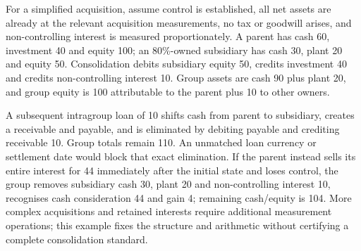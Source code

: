 For a simplified acquisition, assume control is established, all net assets
are already at the relevant acquisition measurements, no tax or goodwill
arises, and non-controlling interest is measured proportionately. A parent
has cash 60, investment 40 and equity 100; an 80\%-owned subsidiary has cash
30, plant 20 and equity 50. Consolidation debits subsidiary equity 50,
credits investment 40 and credits non-controlling interest 10. Group assets
are cash 90 plus plant 20, and group equity is 100 attributable to the parent
plus 10 to other owners.

A subsequent intragroup loan of 10 shifts cash from parent to subsidiary,
creates a receivable and payable, and is eliminated by debiting payable and
crediting receivable 10. Group totals remain 110. An unmatched loan currency
or settlement date would block that exact elimination. If the parent instead
sells its entire interest for 44 immediately after the initial state and
loses control, the group removes subsidiary cash 30, plant 20 and
non-controlling interest 10, recognises cash consideration 44 and gain 4;
remaining cash/equity is 104. More complex acquisitions and retained interests
require additional measurement operations; this example fixes the structure
and arithmetic without certifying a complete consolidation standard.



